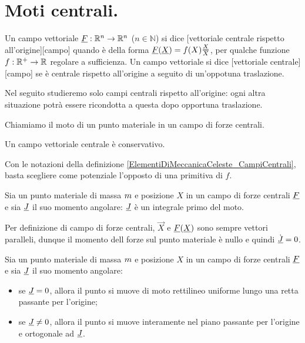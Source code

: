 \section{Moti centrali.}
\label{ElementiDiMeccanicaCeleste_MotiCentrali}
\begin{Definition}
\label{ElementiDiMeccanicaCeleste_CampiCentrali}
	Un campo vettoriale $\underline{F}: \mathbb{R}^n \rightarrow \mathbb{R}^n$ ($n \in \mathbb{N}$) si dice [vettoriale centrale rispetto all'origine][campo] quando \`e della forma $\underline{F}(\underline{X}) = f(X) \frac{\underline{X}}{X}$, per qualche funzione $f: \mathbb{R}^+ \rightarrow \mathbb{R}$ regolare a sufficienza. Un campo vettoriale si dice [vettoriale centrale][campo] se \`e centrale rispetto all'origine a seguito di un'oppotuna traslazione.
\end{Definition}
\par Nel seguito studieremo solo campi centrali rispetto all'origine: ogni altra situazione potr\`a essere ricondotta a questa dopo opportuna traslazione.
\begin{Definition}
	Chiamiamo  il moto di un punto materiale in un campo di forze centrali.
\end{Definition}
\begin{Theorem}
	Un campo vettoriale centrale \`e conservativo.
\end{Theorem}
\Proof Con le notazioni della definizione \ref{ElementiDiMeccanicaCeleste_CampiCentrali}, basta scegliere come potenziale l'opposto di una primitiva di $f$. \EndProof
\begin{Theorem}
	Sia un punto materiale di massa $m$ e posizione $X$ in un campo di forze centrali $\underline{F}$ e sia $\underline{J}$ il suo momento angolare: $\underline{J}$ \`e un integrale primo del moto.
\end{Theorem}
\Proof Per definizione di campo di forze centrali, $\vec{X}$ e $\underline{F}(\underline{X})$ sono sempre vettori paralleli, dunque il momento dell forze sul punto materiale \`e nullo e quindi $\dot{\underline{J}} = 0$. \EndProof
\begin{Theorem}
	Sia un punto materiale di massa $m$ e posizione $X$ in un campo di forze centrali $\underline{F}$ e sia $\underline{J}$ il suo momento angolare:
	\begin{itemize}
		\item se $\underline{J} = 0$, allora il punto si muove di moto rettilineo uniforme lungo una retta passante per l'origine;
		\item se $\underline{J} \neq 0$, allora il punto si muove interamente nel piano passante per l'origine e ortogonale ad $\underline{J}$.
	\end{itemize}
\end{Theorem}
